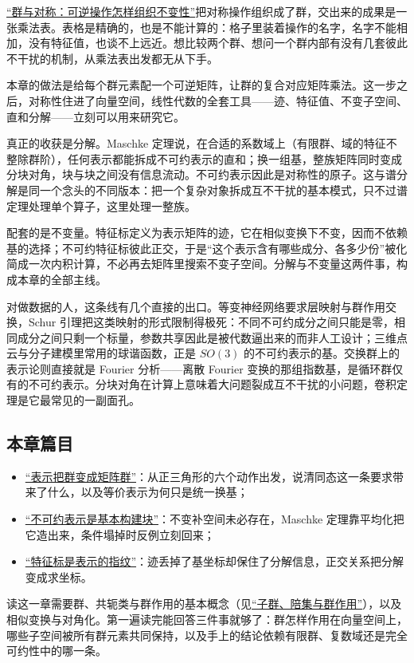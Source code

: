 \hyperref[ch:032]{``群与对称：可逆操作怎样组织不变性''}把对称操作组织成了群，交出来的成果是一张乘法表。表格是精确的，也是不能计算的：格子里装着操作的名字，名字不能相加，没有特征值，也谈不上远近。想比较两个群、想问一个群内部有没有几套彼此不干扰的机制，从乘法表出发都无从下手。

本章的做法是给每个群元素配一个可逆矩阵，让群的复合对应矩阵乘法。这一步之后，对称性住进了向量空间，线性代数的全套工具——迹、特征值、不变子空间、直和分解——立刻可以用来研究它。

真正的收获是分解。Maschke 定理说，在合适的系数域上（有限群、域的特征不整除群阶），任何表示都能拆成不可约表示的直和；换一组基，整族矩阵同时变成分块对角，块与块之间没有信息流动。不可约表示因此是对称性的原子。这与谱分解是同一个念头的不同版本：把一个复杂对象拆成互不干扰的基本模式，只不过谱定理处理单个算子，这里处理一整族。

配套的是不变量。特征标定义为表示矩阵的迹，它在相似变换下不变，因而不依赖基的选择；不可约特征标彼此正交，于是``这个表示含有哪些成分、各多少份''被化简成一次内积计算，不必再去矩阵里搜索不变子空间。分解与不变量这两件事，构成本章的全部主线。

对做数据的人，这条线有几个直接的出口。等变神经网络要求层映射与群作用交换，Schur 引理把这类映射的形式限制得极死：不同不可约成分之间只能是零，相同成分之间只剩一个标量，参数共享因此是被代数逼出来的而非人工设计；三维点云与分子建模里常用的球谐函数，正是 \(SO(3)\) 的不可约表示的基。交换群上的表示论则直接就是 Fourier 分析——离散 Fourier 变换的那组指数基，是循环群仅有的不可约表示。分块对角在计算上意味着大问题裂成互不干扰的小问题，卷积定理是它最常见的一副面孔。

\subsection{本章篇目}

\begin{itemize}
\tightlist
\item \hyperref[sec:04-Discrete-Mathematics/09-Representation-Theory/01]{``表示把群变成矩阵群''}：从正三角形的六个动作出发，说清同态这一条要求带来了什么，以及等价表示为何只是统一换基；
\item \hyperref[sec:04-Discrete-Mathematics/09-Representation-Theory/02]{``不可约表示是基本构建块''}：不变补空间未必存在，Maschke 定理靠平均化把它造出来，条件塌掉时反例立刻回来；
\item \hyperref[sec:04-Discrete-Mathematics/09-Representation-Theory/03]{``特征标是表示的指纹''}：迹丢掉了基坐标却保住了分解信息，正交关系把分解变成求坐标。
\end{itemize}

读这一章需要群、共轭类与群作用的基本概念（见\hyperref[sec:04-Discrete-Mathematics/06-Groups-and-Symmetry/02]{``子群、陪集与群作用''}），以及相似变换与对角化。第一遍读完能回答三件事就够了：群怎样作用在向量空间上，哪些子空间被所有群元素共同保持，以及手上的结论依赖有限群、复数域还是完全可约性中的哪一条。
